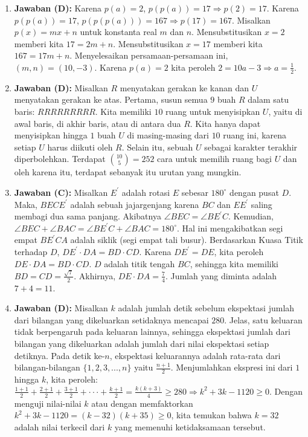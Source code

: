 \documentclass{article}
\begin{document}
\begin{enumerate}
\item \textbf{Jawaban (D):} Karena $p(a)=2$, $p(p(a))=17\Rightarrow p(2)=17$. Karena $p(p(a))=17$, $p(p(p(a)))=167\Rightarrow p(17)=167$. Misalkan $p(x)=mx+n$ untuk konstanta real $m$ dan $n$. Mensubstitusikan $x=2$ memberi kita $17=2m+n$. Mensubstitusikan $x=17$ memberi kita $167=17m+n$. Menyelesaikan persamaan-persamaan ini, $(m,n)=(10,-3)$. Karena $p(a)=2$ kita peroleh $2=10a-3\Rightarrow a=\frac{1}{2}$.

\item \textbf{Jawaban (D):} Misalkan $R$ menyatakan gerakan ke kanan dan $U$ menyatakan gerakan ke atas. Pertama, susun semua $9$ buah $R$ dalam satu baris: $RRRRRRRRR$. Kita memiliki $10$ ruang untuk menyisipkan $U$, yaitu di awal baris, di akhir baris, atau di antara dua $R$. Kita hanya dapat menyisipkan hingga $1$ buah $U$ di masing-masing dari $10$ ruang ini, karena setiap $U$ harus diikuti oleh $R$. Selain itu, sebuah $U$ sebagai karakter terakhir diperbolehkan. Terdapat $\binom{10}{5}=252$ cara untuk memilih ruang bagi $U$ dan oleh karena itu, terdapat sebanyak itu urutan yang mungkin.

\item \textbf{Jawaban (C):} Misalkan $E^{\prime}$ adalah rotasi $E$ sebesar $180^{\circ}$ dengan pusat $D$. Maka, $BECE^{\prime}$ adalah sebuah jajargenjang karena $BC$ dan $EE^{\prime}$ saling membagi dua sama panjang. Akibatnya $\angle BEC=\angle BE^{\prime}C$. Kemudian, $\angle BEC+\angle BAC=\angle BE^{\prime}C+\angle BAC=180^{\circ}$. Hal ini mengakibatkan segi empat $BE^{\prime}CA$ adalah siklik (segi empat tali busur). Berdasarkan Kuasa Titik terhadap $D$, $DE^{\prime}\cdot DA=BD\cdot CD$. Karena $DE^{\prime}=DE$, kita peroleh $DE\cdot DA=BD\cdot CD$. $D$ adalah titik tengah $BC$, sehingga kita memiliki $BD=CD=\frac{\sqrt{7}}{2}$. Akhirnya, $DE\cdot DA=\frac{7}{4}$. Jumlah yang diminta adalah $7+4=11$.

\item \textbf{Jawaban (D):} Misalkan $k$ adalah jumlah detik sebelum ekspektasi jumlah dari bilangan yang dikeluarkan setidaknya mencapai $280$. Jelas, satu keluaran tidak berpengaruh pada keluaran lainnya, sehingga ekspektasi jumlah dari bilangan yang dikeluarkan adalah jumlah dari nilai ekspektasi setiap detiknya. Pada detik ke-$n$, ekspektasi keluarannya adalah rata-rata dari bilangan-bilangan $\{1,2,3,..., n\}$ yaitu $\frac{n+1}{2}$. Menjumlahkan ekspresi ini dari $1$ hingga $k$, kita peroleh: $\frac{1+1}{2}+\frac{2+1}{2}+\frac{3+1}{2}+\cdot\cdot\cdot+\frac{k+1}{2}=\frac{k(k+3)}{4}\ge280\Rightarrow k^{2}+3k-1120\ge0$. Dengan menguji nilai-nilai $k$ atau dengan memfaktorkan $k^{2}+3k-1120=(k-32)(k+35)\ge0$, kita temukan bahwa $k=32$ adalah nilai terkecil dari $k$ yang memenuhi ketidaksamaan tersebut.


\end{enumerate}
\end{document}
